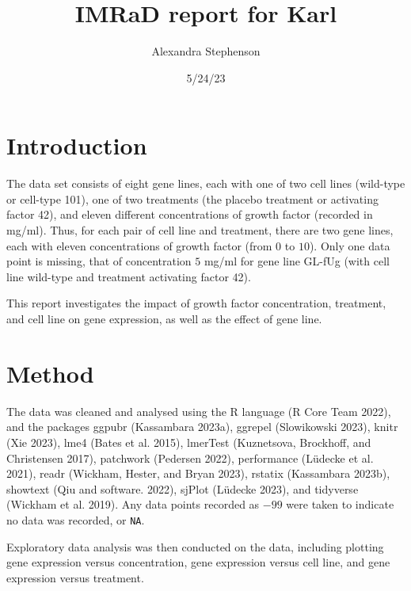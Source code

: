 \documentclass[
  letterpaper,
  DIV=11,
  numbers=noendperiod]{scrartcl}
\title{IMRaD report for Karl}
\author{Alexandra Stephenson}
\date{5/24/23}
\begin{document}
\maketitle
\ifdefined\Shaded\renewenvironment{Shaded}{\begin{tcolorbox}[frame hidden, sharp corners, enhanced, interior hidden, boxrule=0pt, breakable, borderline west={3pt}{0pt}{shadecolor}]}{\end{tcolorbox}}\fi

\hypertarget{introduction}{%
\section{Introduction}\label{introduction}}

The data set consists of eight gene lines, each with one of two cell
lines (wild-type or cell-type 101), one of two treatments (the placebo
treatment or activating factor 42), and eleven different concentrations
of growth factor (recorded in mg/ml). Thus, for each pair of cell line
and treatment, there are two gene lines, each with eleven concentrations
of growth factor (from \(0\) to \(10\)). Only one data point is missing,
that of concentration \(5\) mg/ml for gene line GL-fUg (with cell line
wild-type and treatment activating factor 42).

This report investigates the impact of growth factor concentration,
treatment, and cell line on gene expression, as well as the effect of
gene line.

\hypertarget{method}{%
\section{Method}\label{method}}

The data was cleaned and analysed using the R language (R Core Team
2022), and the packages ggpubr (Kassambara 2023a), ggrepel (Slowikowski
2023), knitr (Xie 2023), lme4 (Bates et al. 2015), lmerTest (Kuznetsova,
Brockhoff, and Christensen 2017), patchwork (Pedersen 2022), performance
(Lüdecke et al. 2021), readr (Wickham, Hester, and Bryan 2023), rstatix
(Kassambara 2023b), showtext (Qiu and software. 2022), sjPlot (Lüdecke
2023), and tidyverse (Wickham et al. 2019). Any data points recorded as
\(-99\) were taken to indicate no data was recorded, or \texttt{NA}.

Exploratory data analysis was then conducted on the data, including
plotting gene expression versus concentration, gene expression versus
cell line, and gene expression versus treatment.
\end{document}
